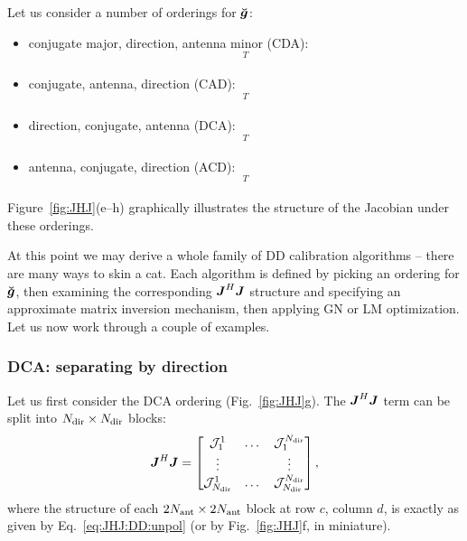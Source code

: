 \documentclass[useAMS,usenatbib]{mn2e}
\makeatletter
\newcommand{\mat}[1]{{\bmath{#1}}}
\newcommand{\JJ}{\mat{J}} %
\newcommand{\JHJ}{\JJ^H\JJ} %
\newcommand{\Matrix}[2]{\left [ \begin{array}{@{}#1@{}}#2\end{array} \right ]}
\newcommand{\AUG}[1]{\bmath{\breve{#1}}}
\newcommand{\Gg}{\AUG{g}}
\numberwithin{equation}{section}
\makeatother
\begin{document}
Let us consider a number of orderings for $\Gg$:

\begin{itemize}
\item conjugate major, direction, antenna minor (CDA):
\begin{equation}
[g^{(1)}_1 \dots g^{(1)}_{\Na}, g^{(2)}_1 \dots g^{(2)}_{\Na}, g^{(3)}_1 \dots g^{(\Nd)}_{\Na}, 
 \bar{g}^{(1)}_1 \dots \bar{g}^{(1)}_{\Na} \dots ]^T
\end{equation}
\item conjugate, antenna, direction (CAD):
\begin{equation}
[g^{(1)}_1 \dots g^{(\Nd)}_1, g^{(1)}_2 \dots g^{(\Nd)}_2, g^{(1)}_3 \dots g^{(\Nd)}_{\Na}, 
 \bar{g}^{(1)}_1 \dots ]^T
\end{equation}
\item direction, conjugate, antenna (DCA):
\begin{equation}
[g^{(1)}_1 \dots g^{(1)}_{\Na},\bar{g}^{(1)}_1 \dots \bar{g}^{(1)}_{\Na},
g^{(2)}_1 \dots g^{(2)}_{\Na}, \bar{g}^{(2)}_1 \dots ]^T
\end{equation}
\item antenna, conjugate, direction (ACD):
\begin{equation}
[g^{(1)}_1 \dots g^{(\Nd)}_1,\bar{g}^{(1)}_1 \dots \bar{g}^{(\Nd)}_1,
g^{(1)}_2 \dots g^{(\Nd)}_2, \bar{g}^{(1)}_2 \dots ]^T
\end{equation}
\end{itemize}

Figure~\ref{fig:JHJ}(e--h) graphically illustrates the structure of the Jacobian under these orderings.

At this point we may derive a whole family of DD calibration algorithms -- there are many ways to skin a cat. Each 
algorithm is defined by picking an ordering for $\Gg$, then examining the corresponding $\JHJ$ structure 
and specifying an approximate matrix inversion mechanism, then applying GN or LM optimization. Let us now work 
through a couple of examples.

\subsubsection{DCA: separating by direction}
\label{sec:dca}

\newcommand{\JJJ}{\mathcal{J}}

Let us first consider the DCA ordering (Fig.~\ref{fig:JHJ}g). The $\JHJ$ term can be split into $N_\mathrm{dir}\times N_\mathrm{dir}$ blocks:
\begin{equation}
\label{eq:JHJ:DD:blocked}
\JHJ = \Matrix{ccc}{\JJJ^1_1 & \dots & \JJJ^{\Nd}_1 \\
\vdots & & \vdots \\
\JJJ_{\Nd}^1 & \dots & \JJJ_{\Nd}^{\Nd} },
\end{equation}
where the structure of each $2N_\mathrm{ant}\times2N_\mathrm{ant}$ block at row $c$, column $d$, is exactly as 
given by Eq.~\ref{eq:JHJ:DD:unpol} (or by Fig.~\ref{fig:JHJ}f, in miniature). 
\end{document}
